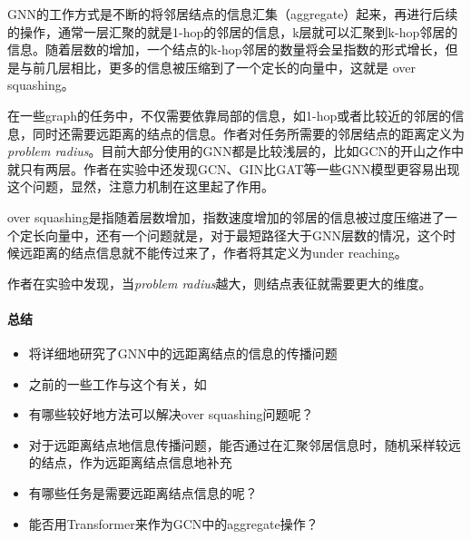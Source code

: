 GNN的工作方式是不断的将邻居结点的信息汇集（aggregate）起来，再进行后续的操作，通常一层汇聚的就是1-hop的邻居的信息，k层就可以汇聚到k-hop邻居的信息。随着层数的增加，一个结点的k-hop邻居的数量将会呈指数的形式增长，但是与前几层相比，更多的信息被压缩到了一个定长的向量中，这就是 over squashing。

在一些graph的任务中，不仅需要依靠局部的信息，如1-hop或者比较近的邻居的信息，同时还需要远距离的结点的信息。作者对任务所需要的邻居结点的距离定义为\textit{problem radius}。目前大部分使用的GNN都是比较浅层的，比如GCN的开山之作中就只有两层。作者在实验中还发现GCN、GIN比GAT等一些GNN模型更容易出现这个问题，显然，注意力机制在这里起了作用。

over squashing是指随着层数增加，指数速度增加的邻居的信息被过度压缩进了一个定长向量中，还有一个问题就是，对于最短路径大于GNN层数的情况，这个时候远距离的结点信息就不能传过来了，作者将其定义为under reaching。

作者在实验中发现，当\textit{problem radius}越大，则结点表征就需要更大的维度。

\paragraph{总结}

\begin{itemize}

	\item 将详细地研究了GNN中的远距离结点的信息的传播问题
	\item 之前的一些工作与这个有关，如\cite{li2019deepgcns}
	\item 有哪些较好地方法可以解决over squashing问题呢？
	\item 对于远距离结点地信息传播问题，能否通过在汇聚邻居信息时，随机采样较远的结点，作为远距离结点信息地补充
	\item 有哪些任务是需要远距离结点信息的呢？
	\item 能否用Transformer来作为GCN中的aggregate操作？

\end{itemize}

